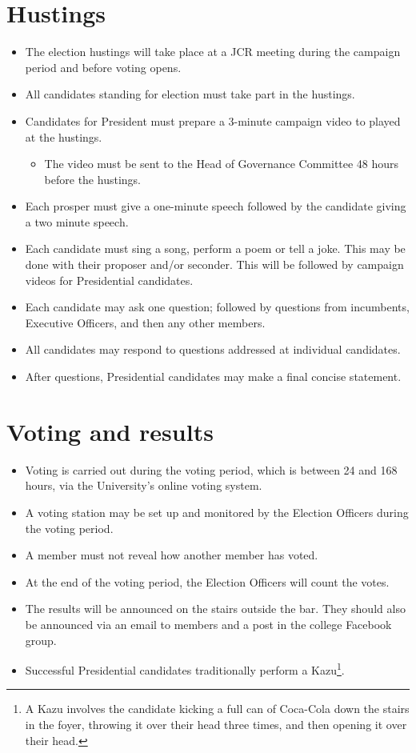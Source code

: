 \documentclass[12pt]{article}
\begin{document}
    \section{Hustings}
    \begin{itemize}
        \item The election hustings will take place at a JCR meeting during the campaign period and
        before voting opens.
        \item All candidates standing for election must take part in the hustings.
        \item Candidates for President must prepare a 3-minute campaign video to played at the
        hustings.
        \begin{itemize}
            \item The video must be sent to the Head of Governance Committee 48 hours before the hustings.
        \end{itemize}
        \item Each prosper must give a one-minute speech followed by the candidate giving a two minute speech.
        \item Each candidate must sing a song, perform a poem or tell a joke. This may be done with their proposer and/or seconder. This will be followed by campaign videos for Presidential candidates.
        \item Each candidate may ask one question; followed by questions from incumbents, Executive Officers, and then any other members.
        \item All candidates may respond to questions addressed at individual candidates.
        \item After questions, Presidential candidates may make a final concise statement.
    \end{itemize}

    \section{Voting and results}
    \begin{itemize}
        \item Voting is carried out during the voting period, which is between 24 and 168 hours, via the University's online voting system.
        \item A voting station may be set up and monitored by the Election Officers during the voting period.
        \item A member must not reveal how another member has voted.
        \item At the end of the voting period, the Election Officers will count the votes.
        \item The results will be announced on the stairs outside the bar. They should also be announced via an email to members and a post in the college Facebook group.
        \item Successful Presidential candidates traditionally perform a Kazu\footnote{A Kazu involves the candidate kicking a full can of Coca-Cola down the stairs in the foyer, throwing it over their head three times, and then opening it over their head.}.
    \end{itemize}
\end{document}
